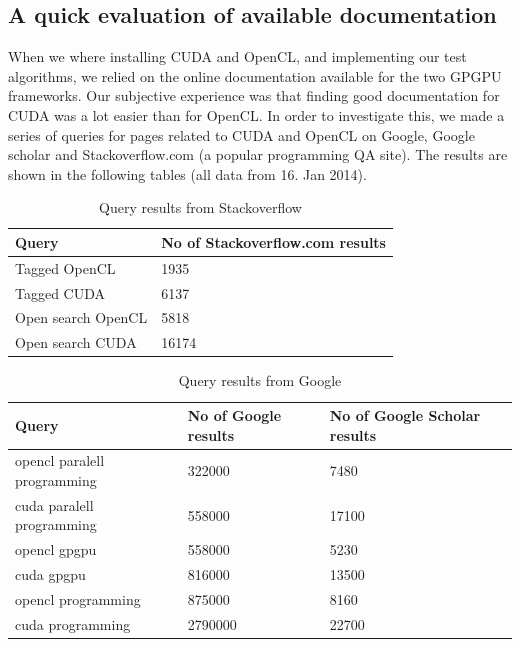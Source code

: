\subsection{A quick evaluation of available documentation} %
\label{sub:a_quick_evaluation_of_available_documentation}

When we where installing CUDA and OpenCL, and implementing our test algorithms, we relied on the online documentation available for the two GPGPU frameworks. Our subjective experience was that finding good documentation for CUDA was a lot easier than for OpenCL\@. In order to investigate this, we made a series of queries for pages related to CUDA and OpenCL on Google, Google scholar and Stackoverflow.com (a popular programming QA site). The results are shown in the following tables (all data from 16. Jan 2014).

\begin{table}[ht]
\centering
    \begin{tabular}{ | l | l |}
    \hline
    \textbf{Query}     & \textbf{No of Stackoverflow.com results}    \\ \hline
    Tagged OpenCL      & 1935                                        \\ \hline
    Tagged CUDA        & 6137                                        \\ \hline
    Open search OpenCL & 5818                                        \\ \hline
    Open search CUDA   & 16174                                       \\ \hline
    \end{tabular}
    \caption{Query results from Stackoverflow}
    \label{fig:stackoverflow-terms-results}
\end{table}

\begin{table}[ht]
\centering
    \begin{tabular}{ | l | l | l |}
    \hline
    \textbf{Query} & \textbf{No of Google results} & \textbf{No of Google Scholar results} \\ \hline
    opencl paralell programming & 322000    & 7480        \\ \hline
    cuda paralell programming   & 558000    & 17100        \\ \hline
    opencl gpgpu                & 558000    & 5230        \\ \hline
    cuda gpgpu                  & 816000    & 13500        \\ \hline
    opencl programming          & 875000    & 8160        \\ \hline
    cuda programming            & 2790000   & 22700        \\ \hline
    \end{tabular}
    \caption{Query results from Google}
    \label{fig:google-terms-results}
\end{table}


